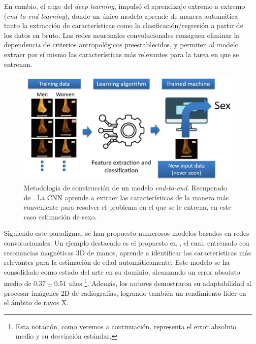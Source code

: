 En cambio, el auge del \textit{deep learning}, impulsó el aprendizaje extremo a extremo 
(\textit{end-to-end learning}), donde un único modelo aprende de manera automática tanto la extracción de 
características como la clasificación/regresión a partir de los 
datos en bruto. Las redes neuronales convolucionales consiguen eliminar la dependencia de criterios 
antropológicos preestablecidos, y permiten al modelo extraer por sí mismo las 
características más relevantes para la tarea en que se entrenan. 

\begin{figure}[h]
    \centering
    \includegraphics[width=\textwidth]{capitulos/cap_03/imagenes/end-to-end_learning.png}
    \caption[
        Metodología de construcción de un modelo \textit{end-to-end}. 
        Recuperado de \cite{venema2022}.
    ]{
        Metodología de construcción de un modelo \textit{end-to-end}. 
        Recuperado de \cite{venema2022}.
        La CNN aprende a extraer las características de la manera más conveniente para resolver el 
        problema en el que se le entrena, en este caso estimación de sexo.
    }
    \label{fig:end-to-end_model}
\end{figure}

Siguiendo este paradigma, se han propuesto numerosos modelos basados en redes convolucionales.
Un ejemplo destacado es el propuesto en \cite{stern2019}, el cual, entrenado con resonancias magnéticas 3D de 
manos, aprende a identificar las características más relevantes para la estimación de edad automáticamente. 
Este modelo se ha consolidado como estado del arte en su dominio, alcanzando un error absoluto medio de 
$0.37 \pm 0.51$ años
\footnote{
    Esta notación, como veremos a continuación, representa el error absoluto medio y su desviación estándar.
}. 
Además, los autores demostraron su adaptabilidad al procesar imágenes 2D de radiografías, logrando también un 
rendimiento líder en el ámbito de rayos X.

